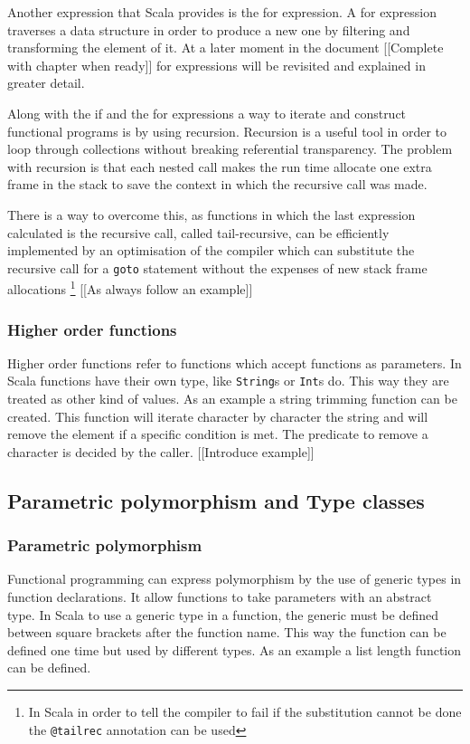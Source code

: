 \documentclass[../main.tex]{subfiles}
\begin{document}
Another expression that Scala provides is the for expression. A for expression traverses a data structure in order to produce a new one by filtering and transforming the element of it. At a later moment in the document [[Complete with chapter when ready]] for expressions will be revisited and explained in greater detail.

Along with the if and the for expressions a way to iterate and construct functional programs is by using recursion. Recursion is a useful tool in order to loop through collections without breaking referential transparency. The problem with recursion is that each nested call makes the run time allocate one extra frame in the stack to save the context in which the recursive call was made.

There is a way to overcome this, as functions in which the last expression calculated is the recursive call, called tail-recursive, can be efficiently implemented by an optimisation of the compiler which can substitute the recursive call for a \texttt{goto} statement without the expenses of new stack frame allocations \autocite{Steele1977DebunkingGoto} \footnote{In Scala in order to tell the compiler to fail if the substitution cannot be done the \texttt{@tailrec} annotation can be used\autocite{ScalaScala.annotation.tailrec}} [[As always follow an example]]

\subsubsection{Higher order functions}
Higher order functions refer to functions which accept functions as parameters. In Scala functions have their own type, like \texttt{String}s or \texttt{Int}s do. This way they are treated as other kind of values. As an example a string trimming function can be created. This function will iterate character by character the string and will remove the element if a specific condition is met. The predicate to remove a character is decided by the caller. [[Introduce example]]

\subsection{Parametric polymorphism and Type classes}
\subsubsection{Parametric polymorphism}
Functional programming can express polymorphism by the use of generic types in function declarations. It allow functions to take parameters with an abstract type. In Scala to use a generic type in a function, the generic must be defined between square brackets after the function name. This way the function can be defined one time but used by different types. As an example a list length function can be defined. 
\end{document}
